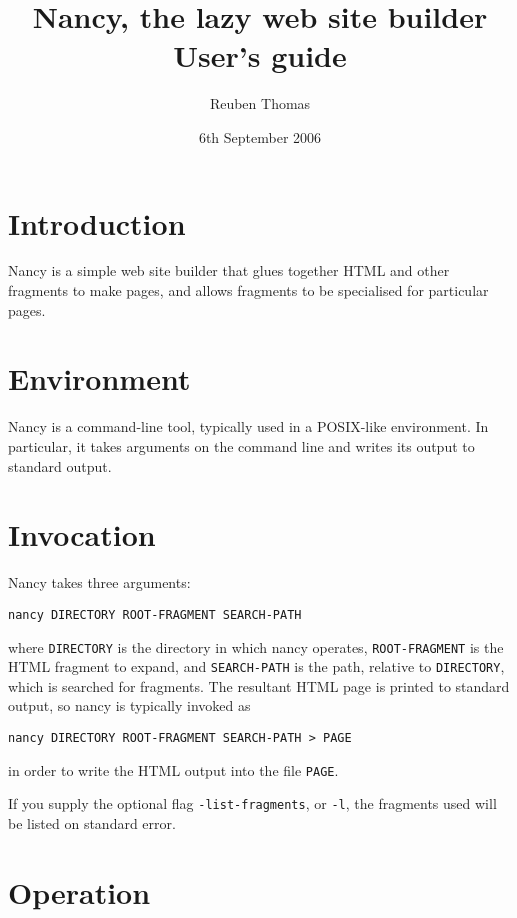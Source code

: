\documentclass[english]{scrartcl}
\begin{document}
\title{Nancy, the lazy web site builder\\User's guide}
\date{6th September 2006}
\author{Reuben Thomas}
\maketitle

\section{Introduction}

Nancy is a simple web site builder that glues together HTML and other
fragments to make pages, and allows fragments to be specialised for
particular pages.

\section{Environment}

Nancy is a command-line tool, typically used in a POSIX-like
environment. In particular, it takes arguments on the command line and
writes its output to standard output.

\section{Invocation}

Nancy takes three arguments:

\begin{verbatim}
nancy DIRECTORY ROOT-FRAGMENT SEARCH-PATH
\end{verbatim}

\noindent where \verb|DIRECTORY| is the directory in which nancy
operates, \verb|ROOT-FRAGMENT| is the HTML fragment to expand, and
\verb|SEARCH-PATH| is the path, relative to \verb|DIRECTORY|,
which is searched for fragments. The resultant HTML page is printed to
standard output, so nancy is typically invoked as

\begin{verbatim}
nancy DIRECTORY ROOT-FRAGMENT SEARCH-PATH > PAGE
\end{verbatim}

\noindent in order to write the HTML output into the file \verb|PAGE|.

If you supply the optional flag \verb|-list-fragments|, or \verb|-l|,
the fragments used will be listed on standard error.

\section{Operation}
\label{operation}
\end{document}
